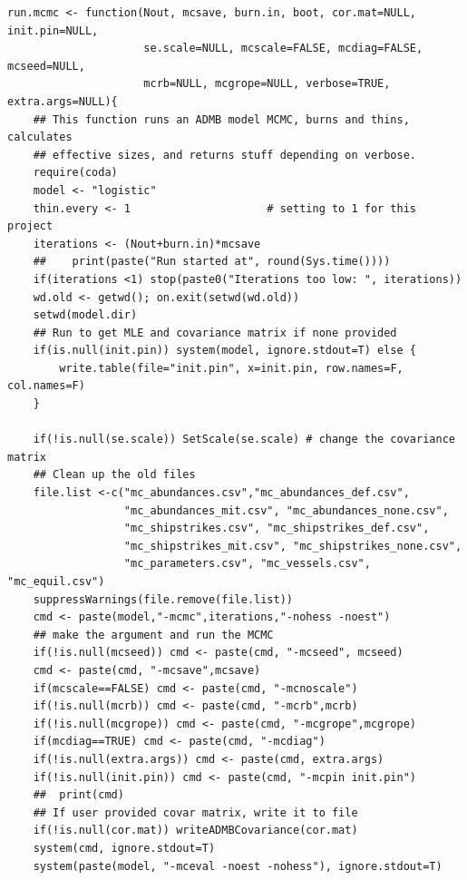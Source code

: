 \documentclass{article}
\begin{document}
\begin{verbatim}
run.mcmc <- function(Nout, mcsave, burn.in, boot, cor.mat=NULL, init.pin=NULL,
                     se.scale=NULL, mcscale=FALSE, mcdiag=FALSE, mcseed=NULL,
                     mcrb=NULL, mcgrope=NULL, verbose=TRUE, extra.args=NULL){
    ## This function runs an ADMB model MCMC, burns and thins, calculates
    ## effective sizes, and returns stuff depending on verbose.
    require(coda)
    model <- "logistic"
    thin.every <- 1                     # setting to 1 for this project
    iterations <- (Nout+burn.in)*mcsave
    ##    print(paste("Run started at", round(Sys.time())))
    if(iterations <1) stop(paste0("Iterations too low: ", iterations))
    wd.old <- getwd(); on.exit(setwd(wd.old))
    setwd(model.dir)
    ## Run to get MLE and covariance matrix if none provided
    if(is.null(init.pin)) system(model, ignore.stdout=T) else {
        write.table(file="init.pin", x=init.pin, row.names=F, col.names=F)
    }

    if(!is.null(se.scale)) SetScale(se.scale) # change the covariance matrix
    ## Clean up the old files
    file.list <-c("mc_abundances.csv","mc_abundances_def.csv",
                  "mc_abundances_mit.csv", "mc_abundances_none.csv",
                  "mc_shipstrikes.csv", "mc_shipstrikes_def.csv",
                  "mc_shipstrikes_mit.csv", "mc_shipstrikes_none.csv",
                  "mc_parameters.csv", "mc_vessels.csv", "mc_equil.csv")
    suppressWarnings(file.remove(file.list))
    cmd <- paste(model,"-mcmc",iterations,"-nohess -noest")
    ## make the argument and run the MCMC
    if(!is.null(mcseed)) cmd <- paste(cmd, "-mcseed", mcseed)
    cmd <- paste(cmd, "-mcsave",mcsave)
    if(mcscale==FALSE) cmd <- paste(cmd, "-mcnoscale")
    if(!is.null(mcrb)) cmd <- paste(cmd, "-mcrb",mcrb)
    if(!is.null(mcgrope)) cmd <- paste(cmd, "-mcgrope",mcgrope)
    if(mcdiag==TRUE) cmd <- paste(cmd, "-mcdiag")
    if(!is.null(extra.args)) cmd <- paste(cmd, extra.args)
    if(!is.null(init.pin)) cmd <- paste(cmd, "-mcpin init.pin")
    ##  print(cmd)
    ## If user provided covar matrix, write it to file
    if(!is.null(cor.mat)) writeADMBCovariance(cor.mat)
    system(cmd, ignore.stdout=T)
    system(paste(model, "-mceval -noest -nohess"), ignore.stdout=T)


\end{verbatim}
\end{document}
